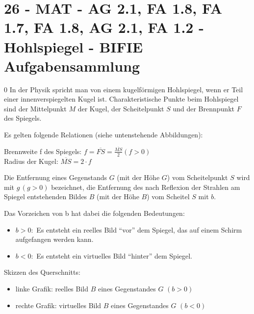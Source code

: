 \section{26 - MAT - AG 2.1, FA 1.8, FA 1.7, FA 1.8, AG 2.1, FA 1.2 - Hohlspiegel - BIFIE Aufgabensammlung}

\begin{langesbeispiel} \item[0] %
				In der Physik spricht man von einem kugelförmigen Hohlspiegel, wenn er Teil einer innenverspiegelten Kugel ist. Charakteristische Punkte beim Hohlspiegel sind der Mittelpunkt $M$ der Kugel, der Scheitelpunkt $S$ und der Brennpunkt $F$ des Spiegels.
				
Es gelten folgende Relationen (siehe untenstehende Abbildungen):

Brennweite f des Spiegels: $f=\overline{FS}=\frac{\overline{MS}}{2} (f>0)$\\
Radius der Kugel: $\overline{MS}=2\cdot f$

Die Entfernung eines Gegenstands $G$ (mit der Höhe $G$) vom Scheitelpunkt $S$ wird mit $g\,(g>0)$ bezeichnet, die Entfernung des nach Reflexion der Strahlen am Spiegel entstehenden Bildes $B$ (mit der Höhe $B$) vom Scheitel $S$ mit $b$.

Das Vorzeichen von b hat dabei die folgenden Bedeutungen:
\begin{itemize}
 \item $b>0:$ Es entsteht ein reelles Bild "`vor"' dem Spiegel, das auf einem Schirm aufgefangen werden kann.
 \item $b<0:$ Es entsteht ein virtuelles Bild "`hinter"' dem Spiegel.
\end{itemize}

Skizzen des Querschnitts:
\begin{itemize}
 \item linke Grafik: reelles Bild $B$ eines Gegenstandes $G$ $(b>0)$
 \item rechte Grafik: virtuelles Bild $B$ eines Gegenstandes $G$ $(b<0)$
\end{itemize}\leer


\end{langesbeispiel}
